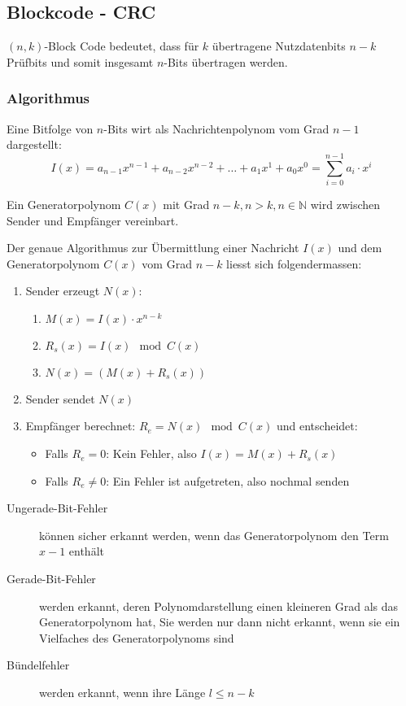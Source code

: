 \subsection{Blockcode - CRC}
$(n, k)$-Block Code bedeutet, dass für $k$ übertragene Nutzdatenbits $n-k$ Prüfbits und somit insgesamt $n$-Bits übertragen werden.

\subsubsection{Algorithmus}
Eine Bitfolge von $n$-Bits wirt als Nachrichtenpolynom vom Grad $n-1$ dargestellt:
\begin{equation*}
 I(x) = a_{n-1}x^{n-1} + a_{n-2}x^{n-2} + \dots + a_1x^1 + a_0x^0 = \sum_{i=0}^{n-1} a_i \cdot x^i
\end{equation*}

Ein Generatorpolynom $C(x)$ mit Grad $n-k, n > k, n \in \mathbb{N}$ wird zwischen Sender und Empfänger
vereinbart.

Der genaue Algorithmus zur Übermittlung einer Nachricht $I(x)$ und dem Generatorpolynom $C(x)$ vom Grad $n-k$ 
liesst sich folgendermassen:
\begin{enumerate}
 \item Sender erzeugt $N(x)$:
    \begin{enumerate}
      \item $M(x) = I(x)\cdot x^{n-k}$
      \item $R_s(x) = I(x) \mod C(x)$
      \item $N(x) = (M(x) + R_s(x))$
    \end{enumerate}
  \item Sender sendet $N(x)$
  \item Empfänger berechnet: $R_e = N(x) \mod C(x)$ und entscheidet:
    \begin{itemize}
     \item Falls $R_e = 0$: Kein Fehler, also $I(x) = M(x) + R_s(x)$
     \item Falls $R_e \neq 0$: Ein Fehler ist aufgetreten, also nochmal senden
    \end{itemize}
\end{enumerate}

\begin{description}
 \item [Ungerade-Bit-Fehler] können sicher erkannt werden, wenn das Generatorpolynom den Term $x-1$ enthält
 \item [Gerade-Bit-Fehler]  werden erkannt, deren Polynomdarstellung einen kleineren Grad als das Generatorpolynom hat,
Sie werden nur dann nicht erkannt, wenn sie ein Vielfaches des Generatorpolynoms sind
  \item [Bündelfehler] werden erkannt, wenn ihre Länge $l \leq n-k$
\end{description}